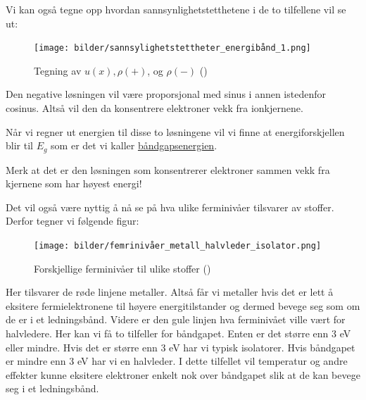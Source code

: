 \documentclass{article}
\begin{document}
Vi kan også tegne opp hvordan sannsynlighetstetthetene i de to tilfellene vil se ut:
\begin{figure}[H]
    \centering
    \texttt{[image: bilder/sannsylighetstettheter\_energibånd\_1.png]}
    \caption{Tegning av $u(x), \rho(+)$, og $\rho(-)$ (\cite{Aleksander})}
    \label{fig:sannsylighetstettheter_energibånd_1}
\end{figure}
Den negative løsningen vil være proporsjonal med sinus i annen istedenfor cosinus. Altså vil den da konsentrere elektroner vekk fra ionkjernene.

Når vi regner ut energien til disse to løsningene vil vi finne at energiforskjellen blir til $E_g$ som er det vi kaller \underline{båndgapsenergien}.

Merk at det er den løsningen som konsentrerer elektroner sammen vekk fra kjernene som har høyest energi!

Det vil også være nyttig å nå se på hva ulike ferminivåer tilsvarer av stoffer. Derfor tegner vi følgende figur:
\begin{figure}[H]
    \centering
    \texttt{[image: bilder/femrinivåer\_metall\_halvleder\_isolator.png]}
    \caption{Forskjellige ferminivåer til ulike stoffer (\cite{Aleksander})}
    \label{fig:femrinivåer_metall_halvleder_isolator}
\end{figure}
Her tilsvarer de røde linjene metaller. Altså får vi metaller hvis det er lett å eksitere fermielektronene til høyere energitilstander og dermed bevege seg som om de er i et ledningsbånd. Videre er den gule linjen hva ferminivået ville vært for halvledere. Her kan vi få to tilfeller for båndgapet. Enten er det større enn 3 eV eller mindre. Hvis det er større enn 3 eV har vi typisk isolatorer. Hvis båndgapet er mindre enn 3 eV har vi en halvleder. I dette tilfellet vil temperatur og andre effekter kunne eksitere elektroner enkelt nok over båndgapet slik at de kan bevege seg i et ledningsbånd.
\end{document}
